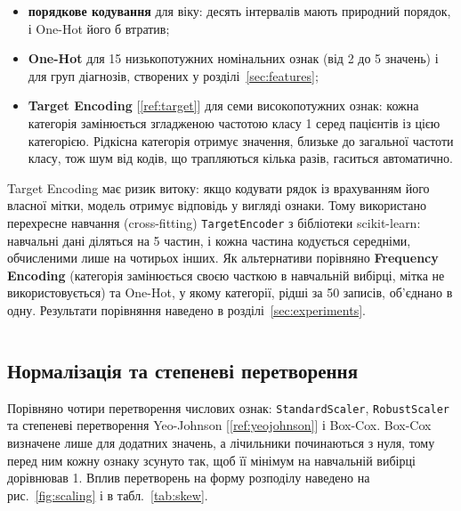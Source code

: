 \documentclass[14pt,a4paper]{extreport}
\begin{document}
\begin{itemize}
\item \textbf{порядкове кодування} для віку: десять інтервалів мають природний порядок, і One-Hot його б втратив;
\item \textbf{One-Hot} для 15 низькопотужних номінальних ознак (від 2 до 5 значень) і для груп діагнозів, створених у розділі~\ref{sec:features};
\item \textbf{Target Encoding} [\ref{ref:target}] для семи високопотужних ознак: кожна категорія замінюється згладженою частотою класу 1 серед пацієнтів із цією категорією. Рідкісна категорія отримує значення, близьке до загальної частоти класу, тож шум від кодів, що трапляються кілька разів, гаситься автоматично.
\end{itemize}

Target Encoding має ризик витоку: якщо кодувати рядок із врахуванням його власної мітки, модель отримує відповідь у вигляді ознаки. Тому використано перехресне навчання (cross-fitting) \texttt{TargetEncoder} з бібліотеки scikit-learn: навчальні дані діляться на 5 частин, і кожна частина кодується середніми, обчисленими лише на чотирьох інших. Як альтернативи порівняно \textbf{Frequency Encoding} (категорія замінюється своєю часткою в навчальній вибірці, мітка не використовується) та One-Hot, у якому категорії, рідші за 50 записів, об'єднано в одну. Результати порівняння наведено в розділі~\ref{sec:experiments}.

\inputminted[firstline=220,lastline=263]{python}{../src/mk1/preprocessing.py}
\label{lst:prep}

\subsection{Нормалізація та степеневі перетворення}
\label{sec:scaling}

Порівняно чотири перетворення числових ознак: \texttt{StandardScaler}, \texttt{RobustScaler} та степеневі перетворення Yeo-Johnson [\ref{ref:yeojohnson}] і Box-Cox. Box-Cox визначене лише для додатних значень, а лічильники починаються з нуля, тому перед ним кожну ознаку зсунуто так, щоб її мінімум на навчальній вибірці дорівнював 1. Вплив перетворень на форму розподілу наведено на рис.~\ref{fig:scaling} і в табл.~\ref{tab:skew}.
\end{document}
